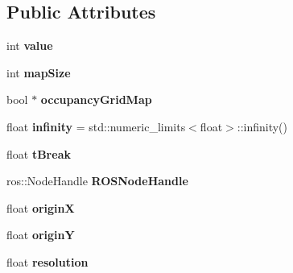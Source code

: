 \subsection*{Public Attributes}
\begin{DoxyCompactItemize}
\item 
\mbox{\label{classastar__plugin_1_1_a_star_planner_afb117804426fe5f1a9a882a0da06047a}} 
int {\bfseries value}
\item 
\mbox{\label{classastar__plugin_1_1_a_star_planner_a5edf65eab6aa9be80520ebbcaa9e6704}} 
int {\bfseries map\+Size}
\item 
\mbox{\label{classastar__plugin_1_1_a_star_planner_a205a9cf7b62779627bf89c8b0d78f391}} 
bool $\ast$ {\bfseries occupancy\+Grid\+Map}
\item 
\mbox{\label{classastar__plugin_1_1_a_star_planner_a0d9b3ad5c3a83a96192609939af84c3d}} 
float {\bfseries infinity} = std\+::numeric\+\_\+limits$<$float$>$\+::infinity()
\item 
\mbox{\label{classastar__plugin_1_1_a_star_planner_aae46db226358860bb296612e97a67617}} 
float {\bfseries t\+Break}
\item 
\mbox{\label{classastar__plugin_1_1_a_star_planner_ab20d703c7c32c96a523295cf07f8ef99}} 
ros\+::\+Node\+Handle {\bfseries R\+O\+S\+Node\+Handle}
\item 
\mbox{\label{classastar__plugin_1_1_a_star_planner_a9accb42a886464ae84db5259aad9c444}} 
float {\bfseries originX}
\item 
\mbox{\label{classastar__plugin_1_1_a_star_planner_aa680b5cf31ff141738c409c4e86dbba6}} 
float {\bfseries originY}
\item 
\mbox{\label{classastar__plugin_1_1_a_star_planner_a698245ae6075cbbcb7d50d949025df95}} 
float {\bfseries resolution}
\item 

\end{DoxyCompactItemize}
